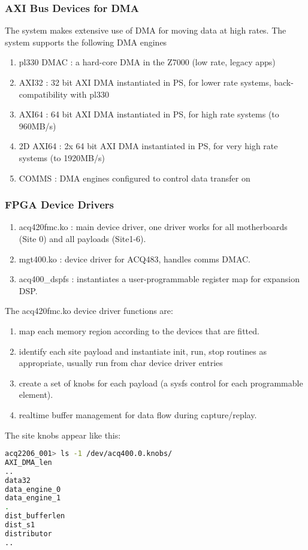 \documentclass[]{article}
\begin{document}
\subsubsection{AXI Bus Devices for DMA}
The  system makes extensive use of DMA for moving data at high rates. The system supports the following DMA engines
\begin{enumerate}
    \item pl330 DMAC : a hard-core DMA in the Z7000 (low rate, legacy apps)  
    \item AXI32 : 32 bit AXI DMA instantiated in PS, for lower rate systems, back-compatibility with pl330
    \item AXI64 : 64 bit AXI DMA instantiated in PS, for high rate systems (to 960MB/s)
    \item 2D AXI64 : 2x 64 bit AXI DMA instantiated in PS, for very high rate systems (to 1920MB/s)
    \item COMMS : DMA engines configured to control data transfer on 
\end{enumerate}

\subsubsection{FPGA Device Drivers}
\begin{enumerate}
	\item acq420fmc.ko : main device driver, one driver works for all motherboards (Site 0) and all payloads (Site1-6).
	\item mgt400.ko    : device driver for ACQ483, handles comms DMAC.
	\item acq400_dspfs : instantiates a user-programmable register map for expansion DSP.
\end{enumerate}
The acq420fmc.ko device driver functions are:
\begin{enumerate}
	\item map each memory region according to the devices that are fitted.
	\item identify each site payload and instantiate init, run, stop routines as appropriate, usually run from char device driver entries
	\item create a set of knobs for each payload (a sysfs control for each programmable element).
	\item realtime buffer management for data flow during capture/replay.
\end{enumerate}
The site knobs appear like this:
\begin{lstlisting}[language=bash,style=bashstyle,frame=single]
acq2206_001> ls -1 /dev/acq400.0.knobs/
AXI_DMA_len
..
data32
data_engine_0
data_engine_1
.
dist_bufferlen
dist_s1
distributor
..
\end{lstlisting}
\end{document}
